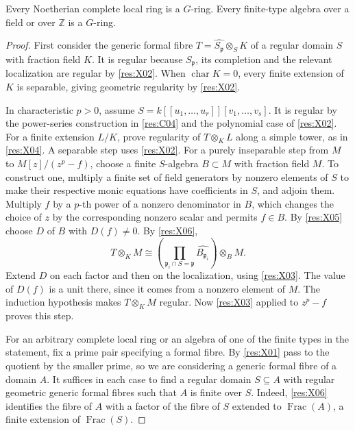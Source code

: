 \begin{theorem}\label{res:X07}
Every Noetherian complete local ring is a \(G\)-ring. Every finite-type algebra over a field or over \(\mathbb Z\) is a \(G\)-ring.
\end{theorem}
\begin{proof}
First consider the generic formal fibre \(T=\widehat{S_{\mathfrak p}}\otimes_S K\) of a regular domain \(S\) with fraction field \(K\). It is regular because \(S_{\mathfrak p}\), its completion and the relevant localization are regular by \ref{res:X02}. When \(\operatorname{char}K=0\), every finite extension of \(K\) is separable, giving geometric regularity by \ref{res:X02}.

In characteristic \(p>0\), assume \(S=k[[u_1,\dots,u_r]][v_1,\dots,v_s]\). It is regular by the power-series construction in \ref{res:C04} and the polynomial case of \ref{res:X02}. For a finite extension \(L/K\), prove regularity of \(T\otimes_K L\) along a simple tower, as in \ref{res:X04}. A separable step uses \ref{res:X02}. For a purely inseparable step from \(M\) to \(M[z]/(z^p-f)\), choose a finite \(S\)-algebra \(B\subset M\) with fraction field \(M\). To construct one, multiply a finite set of field generators by nonzero elements of \(S\) to make their respective monic equations have coefficients in \(S\), and adjoin them. Multiply \(f\) by a \(p\)-th power of a nonzero denominator in \(B\), which changes the choice of \(z\) by the corresponding nonzero scalar and permits \(f\in B\). By \ref{res:X05} choose \(D\) of \(B\) with \(D(f)\ne0\). By \ref{res:X06},
\[
 T\otimes_K M\cong
 \left(\prod_{\mathfrak p_i\cap S=\mathfrak p}\widehat{B_{\mathfrak p_i}}\right)
                       \otimes_B M .
\]
Extend \(D\) on each factor and then on the localization, using \ref{res:X03}. The value of \(D(f)\) is a unit there, since it comes from a nonzero element of \(M\). The induction hypothesis makes \(T\otimes_K M\) regular. Now \ref{res:X03} applied to \(z^p-f\) proves this step.

For an arbitrary complete local ring or an algebra of one of the finite types in the statement, fix a prime pair specifying a formal fibre. By \ref{res:X01} pass to the quotient by the smaller prime, so we are considering a generic formal fibre of a domain \(A\). It suffices in each case to find a regular domain \(S\subseteq A\) with regular geometric generic formal fibres such that \(A\) is finite over \(S\). Indeed, \ref{res:X06} identifies the fibre of \(A\) with a factor of the fibre of \(S\) extended to \(\operatorname{Frac}(A)\), a finite extension of \(\operatorname{Frac}(S)\).


\end{proof}
